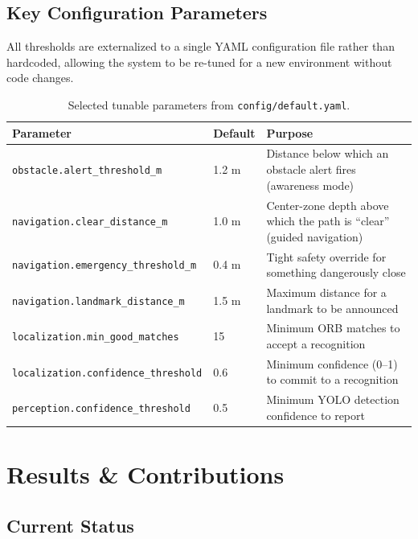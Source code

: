 \documentclass[12pt,a4paper]{article}
\begin{document}
\subsection{Key Configuration Parameters}
All thresholds are externalized to a single YAML configuration file rather than hardcoded, allowing the system to be re-tuned for a new environment without code changes.

\begin{table}[H]
\centering
\begin{tabularx}{\textwidth}{l l X}
\toprule
\textbf{Parameter} & \textbf{Default} & \textbf{Purpose} \\
\midrule
\texttt{obstacle.alert\_threshold\_m} & 1.2 m & Distance below which an obstacle alert fires (awareness mode) \\
\texttt{navigation.clear\_distance\_m} & 1.0 m & Center-zone depth above which the path is ``clear'' (guided navigation) \\
\texttt{navigation.emergency\_threshold\_m} & 0.4 m & Tight safety override for something dangerously close \\
\texttt{navigation.landmark\_distance\_m} & 1.5 m & Maximum distance for a landmark to be announced \\
\texttt{localization.min\_good\_matches} & 15 & Minimum ORB matches to accept a recognition \\
\texttt{localization.confidence\_threshold} & 0.6 & Minimum confidence (0--1) to commit to a recognition \\
\texttt{perception.confidence\_threshold} & 0.5 & Minimum YOLO detection confidence to report \\
\bottomrule
\end{tabularx}
\caption{Selected tunable parameters from \texttt{config/default.yaml}.}
\label{tab:config}
\end{table}

\section{Results \& Contributions}

\subsection{Current Status}
\end{document}
